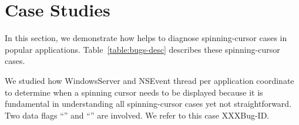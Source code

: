 \section{Case Studies}\label{sec:casestudy}

In this section, we demonstrate how \xxx helps to diagnose \nbug spinning-cursor
cases in \napps popular applications. Table~\ref{table:bugs-desc} describes
these spinning-cursor cases.

We studied how WindowsServer and NSEvent thread per application coordinate to
determine when a spinning cursor needs to be displayed because it is fundamental
in understanding all spinning-cursor cases yet not straightforward. Two data
flags ``'' and ``''
are involved. We refer to this case XXXBug-ID.

